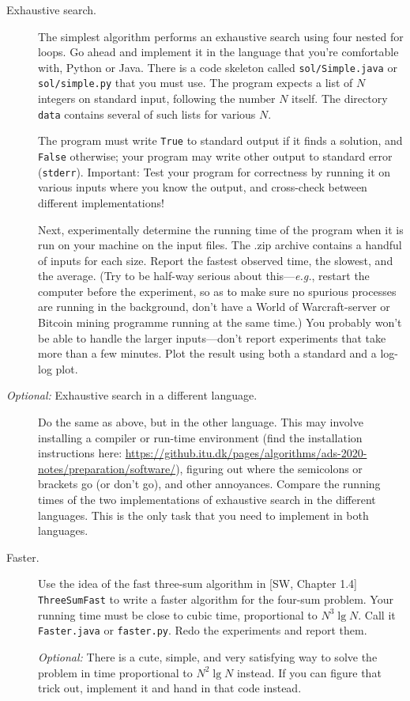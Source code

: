 \documentclass{tufte-handout}
\begin{document}
\begin{description}
  \item[Exhaustive search.]
The simplest algorithm performs an exhaustive search using four nested for loops.
Go ahead and implement it in the language that you're comfortable with, Python or Java.
There is a code skeleton called \texttt{sol/Simple.java} or \texttt{sol/simple.py} that you must use.
The program expects a list of $N$ integers on standard input, following the number $N$ itself.
The directory \texttt{data} contains several of such lists for various $N$.

The program must write \texttt{True} to standard output if it finds a solution, and \texttt{False} otherwise;
your program may write other output to standard error (\texttt{stderr}).
Important: Test your program for correctness by running it on various inputs where you know the output, and cross-check between different implementations!

Next, experimentally determine the running time of the program when it is run on your machine on the input files.
The .zip archive contains a handful of inputs for each size.
Report the fastest observed time, the slowest, and the average.
(Try to be half-way serious about this---\emph{e.g.}, restart the computer before the experiment, so as to make sure no spurious processes are running in the background, don't have a World of Warcraft-server or Bitcoin mining programme running at the same time.)
You probably won't be able to handle the larger inputs---don't report experiments that take more than a few minutes.
Plot the result using both a standard and a log-log plot.

\item[\emph{Optional:} Exhaustive search in a different language.]
  Do the same as above, but in the other language.
  This may involve installing a compiler or run-time environment (find the installation instructions here: \url{https://github.itu.dk/pages/algorithms/ads-2020-notes/preparation/software/}), figuring out where the semicolons or brackets go (or don't go), and other annoyances.
  Compare the running times of the two implementations of exhaustive search in the different languages.
  This is the only task that you need to implement in both languages.

\item[Faster.]
  Use the idea of the fast three-sum algorithm in [SW, Chapter 1.4] \texttt{
  ThreeSumFast} to write a faster algorithm for the four-sum problem.
  Your running time must be close to cubic time, proportional to $N^3\operatorname{lg} N$.
  Call it \texttt{Faster.java}  or \texttt{faster.py}.
  Redo the experiments and report them.

  \emph{Optional:} There is a cute, simple, and very satisfying way to solve the problem in time proportional to $N^2\operatorname{lg} N$ instead.
If you can figure that trick out, implement it and hand in that code instead.
\end{description}
\end{document}
